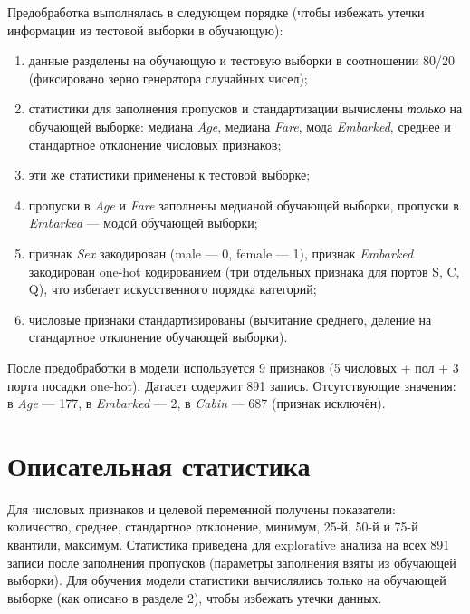 \documentclass[12pt,a4paper]{article}
\begin{document}
Предобработка выполнялась в следующем порядке (чтобы избежать утечки информации из тестовой выборки в обучающую):
\begin{enumerate}
\item данные разделены на обучающую и тестовую выборки в соотношении 80/20 (фиксировано зерно генератора случайных чисел);
\item статистики для заполнения пропусков и стандартизации вычислены \emph{только} на обучающей выборке: медиана \emph{Age}, медиана \emph{Fare}, мода \emph{Embarked}, среднее и стандартное отклонение числовых признаков;
\item эти же статистики применены к тестовой выборке;
\item пропуски в \emph{Age} и \emph{Fare} заполнены медианой обучающей выборки, пропуски в \emph{Embarked} --- модой обучающей выборки;
\item признак \emph{Sex} закодирован (male --- 0, female --- 1), признак \emph{Embarked} закодирован one-hot кодированием (три отдельных признака для портов S, C, Q), что избегает искусственного порядка категорий;
\item числовые признаки стандартизированы (вычитание среднего, деление на стандартное отклонение обучающей выборки).
\end{enumerate}

После предобработки в модели используется 9 признаков (5 числовых + пол + 3 порта посадки one-hot). Датасет содержит 891 запись. Отсутствующие значения: в \emph{Age} --- 177, в \emph{Embarked} --- 2, в \emph{Cabin} --- 687 (признак исключён).

\section{Описательная статистика}
Для числовых признаков и целевой переменной получены показатели: количество, среднее, стандартное отклонение, минимум, 25-й, 50-й и 75-й квантили, максимум. Статистика приведена для explorative анализа на всех 891 записи после заполнения пропусков (параметры заполнения взяты из обучающей выборки). Для обучения модели статистики вычислялись только на обучающей выборке (как описано в разделе 2), чтобы избежать утечки данных.
\end{document}
